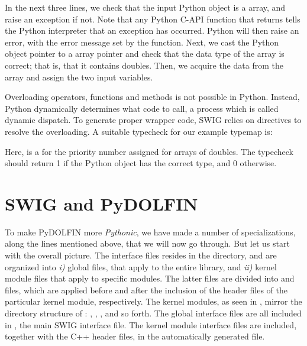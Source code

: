 In the next three lines, we check that the input Python object is a \numpy array, and raise an exception if not.
Note that any Python C-API function that returns  tells the
Python interpreter that an exception has occurred. Python will then raise
an error, with the error message set by the 
function. Next, we cast the Python object pointer to a \numpy array pointer
and check that the data type of the \numpy array is correct; that is, that it contains doubles. Then, we acquire the data from the \numpy array and assign the two input variables.

Overloading operators, functions and methods is not possible in Python.
Instead, Python dynamically determines what code to call,  
a process which is called dynamic dispatch.
To generate proper wrapper code, 
SWIG relies on  directives to resolve the overloading. 
A suitable typecheck for our example typemap is:
Here,  is a  for the priority number assigned for arrays of doubles. The typecheck should return 1 if the Python object  has the correct type, and 0 otherwise.
\section{SWIG and PyDOLFIN}
To make PyDOLFIN more \textit{Pythonic}, we have made a number of
specializations, along the lines mentioned above, that we will now go
through. But let us start with the
overall picture.   
The interface files resides in the  directory, and are
organized into \textit{i)} global files, that apply to the entire \dolfin
library, and \textit{ii)} kernel module files that apply to specific
\dolfin modules. The latter files are divided into 
and  files, which are applied before and after the
inclusion of the header files of the particular kernel module, respectively. 
The kernel modules, as seen in , mirror the directory structure of \dolfin: , , ,  and so forth. The global interface files are all included in , the main SWIG interface file. The kernel module interface files are included, together with the C++ header files, in the automatically generated  file.


